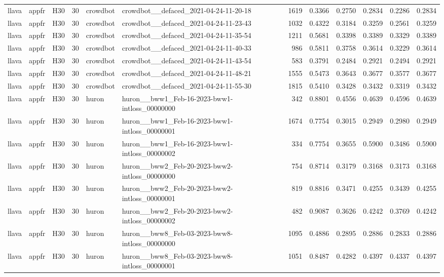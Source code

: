 \begin{table}[tbp]
\begin{tabular}{lllrllrrrrrr}
llava & appfr & H30 & 30 & crowdbot & crowdbot\_\_defaced\_2021-04-24-11-20-18 & 1619 & 0.3366 & 0.2750 & 0.2834 & 0.2286 & 0.2834 \\
llava & appfr & H30 & 30 & crowdbot & crowdbot\_\_defaced\_2021-04-24-11-23-43 & 1032 & 0.4322 & 0.3184 & 0.3259 & 0.2561 & 0.3259 \\
llava & appfr & H30 & 30 & crowdbot & crowdbot\_\_defaced\_2021-04-24-11-35-54 & 1211 & 0.5681 & 0.3398 & 0.3389 & 0.3329 & 0.3389 \\
llava & appfr & H30 & 30 & crowdbot & crowdbot\_\_defaced\_2021-04-24-11-40-33 & 986 & 0.5811 & 0.3758 & 0.3614 & 0.3229 & 0.3614 \\
llava & appfr & H30 & 30 & crowdbot & crowdbot\_\_defaced\_2021-04-24-11-43-54 & 583 & 0.3791 & 0.2484 & 0.2921 & 0.2494 & 0.2921 \\
llava & appfr & H30 & 30 & crowdbot & crowdbot\_\_defaced\_2021-04-24-11-48-21 & 1555 & 0.5473 & 0.3643 & 0.3677 & 0.3577 & 0.3677 \\
llava & appfr & H30 & 30 & crowdbot & crowdbot\_\_defaced\_2021-04-24-11-55-30 & 1815 & 0.5410 & 0.3428 & 0.3432 & 0.3319 & 0.3432 \\
llava & appfr & H30 & 30 & huron & huron\_\_bww1\_Feb-16-2023-bww1-intloss\_00000000 & 342 & 0.8801 & 0.4556 & 0.4639 & 0.4596 & 0.4639 \\
llava & appfr & H30 & 30 & huron & huron\_\_bww1\_Feb-16-2023-bww1-intloss\_00000001 & 1674 & 0.7754 & 0.3015 & 0.2949 & 0.2980 & 0.2949 \\
llava & appfr & H30 & 30 & huron & huron\_\_bww1\_Feb-16-2023-bww1-intloss\_00000002 & 334 & 0.7754 & 0.3655 & 0.5900 & 0.3486 & 0.5900 \\
llava & appfr & H30 & 30 & huron & huron\_\_bww2\_Feb-20-2023-bww2-intloss\_00000000 & 754 & 0.8714 & 0.3179 & 0.3168 & 0.3173 & 0.3168 \\
llava & appfr & H30 & 30 & huron & huron\_\_bww2\_Feb-20-2023-bww2-intloss\_00000001 & 819 & 0.8816 & 0.3471 & 0.4255 & 0.3439 & 0.4255 \\
llava & appfr & H30 & 30 & huron & huron\_\_bww2\_Feb-20-2023-bww2-intloss\_00000002 & 482 & 0.9087 & 0.3626 & 0.4242 & 0.3769 & 0.4242 \\
llava & appfr & H30 & 30 & huron & huron\_\_bww8\_Feb-03-2023-bww8-intloss\_00000000 & 1095 & 0.4886 & 0.2895 & 0.2886 & 0.2833 & 0.2886 \\
llava & appfr & H30 & 30 & huron & huron\_\_bww8\_Feb-03-2023-bww8-intloss\_00000001 & 1051 & 0.8487 & 0.4282 & 0.4397 & 0.4337 & 0.4397 \\

\end{tabular}
\end{table}
